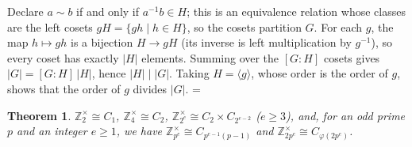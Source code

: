 \documentclass[11pt]{article}
\makeatletter
\theoremstyle{ntstyle}
\newtheorem{theorem}{Theorem}[subsection]
\let\nt@closedisplay\]
\def\nt@guardedclose{\@ifnextchar\par{\nt@closeafterpar}{\@ifnextchar\end{\postdisplaypenalty\@M\nt@closedisplay}{\nt@closedisplay}}}
\def\nt@closeafterpar\par{\@ifnextchar\par{\nt@closeafterpar}{\@ifnextchar\end{\postdisplaypenalty\@M\nt@closedisplay\par}{\nt@closedisplay\par}}}
\renewenvironment{proof}[1][\proofname]{\par
  \pushQED{\qed}\normalfont\topsep\medskipamount\edef\nt@afterproof{\@endparpenalty=\the\@endparpenalty\relax}\@beginparpenalty\@M\@endparpenalty\@M\let\]\nt@guardedclose\trivlist\item[]\textit{#1\@addpunct{.}} \ignorespaces}{\ifvmode\addpenalty\@M\fi\popQED\nt@afterproof\endtrivlist\@endpefalse}
\newcommand{\ZmodUnits}[1]{\mathbb{Z}_{#1}^{\times}}
\makeatother
\begin{document}
\begin{proof} Declare $a \sim b$ if and only if $a^{-1}b \in H$;
	this is an equivalence relation whose classes are the left cosets
	$gH = \{gh \mid h \in H\}$, so the cosets partition $G$. For each $g$,
	the map $h \mapsto gh$ is a bijection $H \to gH$ (its inverse is left
	multiplication by $g^{-1}$), so every coset has exactly $|H|$
	elements. Summing over the $[G:H]$ cosets gives $|G| = [G:H]\,|H|$,
	hence $|H| \mid |G|$. Taking $H = \langle g\rangle$, whose order is
	the order of $g$, shows that the order of $g$ divides $|G|$.
\end{proof}
\begin{theorem}\label{thm:6.6.3} $\ZmodUnits{2} \cong C_1$,
	$\ZmodUnits{4} \cong C_2$, $\ZmodUnits{2^{e}} \cong
		C_2 \times C_{2^{e-2}}$ ($e \ge 3$), and, for an odd prime $p$ and
	an integer $e\ge1$,
	we have $\ZmodUnits{p^{e}} \cong C_{p^{e-1}(p-1)}$ and $\ZmodUnits{2
			p^{e}} \cong C_{\varphi(2p^{e})}$.
\end{theorem}
\end{document}
